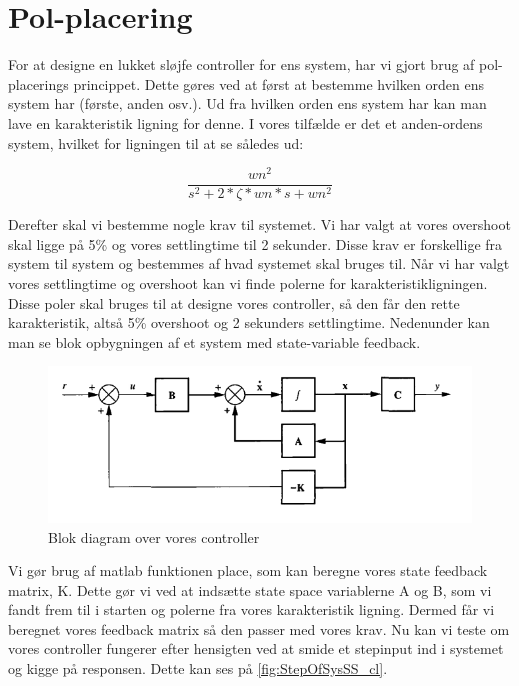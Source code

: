 \graphicspath{{Chapters/Pol-placering/}}

\section{Pol-placering}
For at designe en lukket sløjfe controller for ens system, har vi gjort brug af pol-placerings princippet. Dette gøres ved at først at bestemme hvilken orden ens system har (første, anden osv.). Ud fra hvilken orden ens system har kan man lave en karakteristik ligning for denne. I vores tilfælde er det et anden-ordens system, hvilket for ligningen til at se således ud:

\begin{equation}
 \frac{wn^2}{s^2+2*\zeta*wn*s+wn^2}
\end{equation}


Derefter skal vi bestemme nogle krav til systemet. Vi har valgt at vores overshoot skal ligge på 5\% og vores settlingtime til 2 sekunder. Disse krav er forskellige fra system til system og bestemmes af hvad systemet skal bruges til. Når vi har valgt vores settlingtime og overshoot kan vi finde polerne for karakteristikligningen. Disse poler skal bruges til at designe vores controller, så den får den rette karakteristik, altså 5\% overshoot og 2 sekunders settlingtime. Nedenunder kan man se blok opbygningen af et system med state-variable feedback.


\begin{figure}[H]
	\centering
	\includegraphics[width = 400pt]{Img/Controller_blok.png}
	\caption{Blok diagram over vores controller}
	\label{fig:Blok_CL}
\end{figure}

Vi gør brug af matlab funktionen place, som kan beregne vores state feedback matrix, K. Dette gør vi ved at indsætte state space variablerne A og B, som vi fandt frem til i starten og polerne fra vores karakteristik ligning. Dermed får vi beregnet vores feedback matrix så den passer med vores krav.
Nu kan vi teste om vores controller fungerer efter hensigten ved at smide et stepinput ind i systemet og kigge på responsen. Dette kan ses på \autoref{fig:StepOfSysSS_cl}.  

